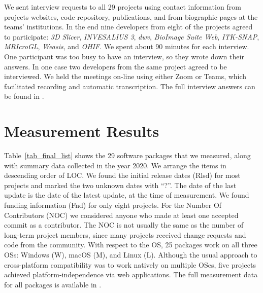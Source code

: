 \documentclass[11pt]{article}
\begin{document}
We sent interview requests to all 29 projects using contact information from
projects websites, code repository, publications, and from biographic pages at
the teams' institutions.  In the end nine developers from eight of the projects
agreed to participate: \textit{3D Slicer}, \textit{INVESALIUS 3}, \textit{dwv},
\textit{BioImage Suite Web}, \textit{ITK-SNAP}, \textit{MRIcroGL},
\textit{Weasis}, and \textit{OHIF}. We spent about 90 minutes for each
interview. One participant was too busy to have an interview, so they wrote down
their answers. In one case two developers from the same project agreed to be
interviewed. We held the meetings on-line using either Zoom or Teams, which
facilitated recording and automatic transcription. The full interview answers
can be found in \citet{Dong2021}.

\section{Measurement Results} \label{ch_results}

Table~\ref{tab_final_list} shows the 29 software packages that we measured,
along with summary data collected in the year 2020. We arrange the items in
descending order of LOC. We found the initial release dates (Rlsd) for most
projects and marked the two unknown dates with ``?''. The date of the last
update is the date of the latest update, at the time of measurement. We found
funding information (Fnd) for only eight projects.  For the Number Of
Contributors (NOC) we considered anyone who made at least one accepted commit as
a contributor. The NOC is not usually the same as the number of long-term
project members, since many projects received change requests and code from the
community.  With respect to the OS, 25 packages work on all three OSs: Windows
(W), macOS (M), and Linux (L). Although the usual approach to cross-platform
compatibility was to work natively on multiple OSes, five projects achieved
platform-independence via web applications. The full measurement data for all
packages is available in \citet{Dong2021-Data}.
\end{document}
